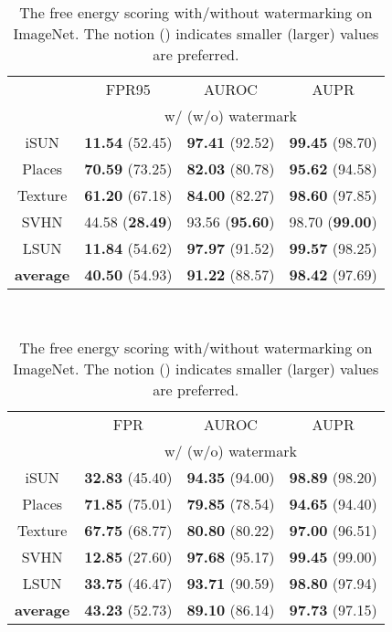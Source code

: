 \documentclass{article}
\begin{document}
\begin{table}[t]
\parbox{.47\linewidth}{
\centering
\caption{{The softmax scoring with/without watermarking on ImageNet. The notion  () indicates smaller (larger) values are preferred.}} \label{tab: imagenet_sm}
\vspace{5pt}
\scriptsize
{
\begin{tabular}{c|ccc}
\toprule[1.5pt]
                   & FPR95      & AUROC        & AUPR       \\
                   \cline{2-4} 
\multirow{-2}{*}{} & \multicolumn{3}{c}{w/ (w/o) watermark} \\
\midrule[0.6pt]
iSUN               & \textbf{11.54} (52.45) & \textbf{97.41} (92.52) & \textbf{99.45} (98.70) \\
Places        & \textbf{70.59} (73.25) & \textbf{82.03} (80.78) & \textbf{95.62} (94.58) \\
Texture            & \textbf{61.20} ({67.18}) & \textbf{84.00} ({82.27}) & \textbf{98.60} ({97.85}) \\
SVHN               & {44.58} (\textbf{28.49}) & {93.56} (\textbf{95.60}) & {98.70} (\textbf{99.00}) \\
LSUN               & \textbf{11.84} (54.62) & \textbf{97.97} (91.52) & \textbf{99.57} (98.25) \\
\midrule
\textbf{average}   & \textbf{40.50} (54.93) & \textbf{91.22} (88.57) & \textbf{98.42} (97.69) \\ \bottomrule[1.5pt]      
\end{tabular}
}}~~~~
\parbox{.47\linewidth}{
\centering
\caption{{The free energy scoring with/without watermarking on ImageNet. The notion  () indicates smaller (larger) values are preferred.}} \label{tab: imagenet_fe}
\vspace{5pt}
\scriptsize{
\begin{tabular}{c|ccc}
\toprule[1.5pt]
                   & FPR      & AUROC        & AUPR       \\
                   \cline{2-4} 
\multirow{-2}{*}{} & \multicolumn{3}{c}{w/ (w/o) watermark} \\
\midrule[0.6pt]
iSUN               & \textbf{32.83} (45.40) & \textbf{94.35} (94.00) & \textbf{98.89} (98.20) \\ 
Places        & \textbf{71.85} (75.01) & \textbf{79.85} (78.54) & \textbf{94.65} (94.40) \\
Texture            & \textbf{67.75} (68.77) & \textbf{80.80} (80.22) & \textbf{97.00} (96.51) \\
SVHN               & \textbf{12.85} (27.60) & \textbf{97.68} (95.17) & \textbf{99.45} (99.00) \\
LSUN               & \textbf{33.75} (46.47) & \textbf{93.71} (90.59) & \textbf{98.80} (97.94) \\
\midrule
\textbf{average}   & \textbf{43.23} (52.73) & \textbf{89.10} (86.14) & \textbf{97.73} (97.15) \\ \bottomrule[1.5pt]      
\end{tabular}
}}
\end{table}
\end{document}
